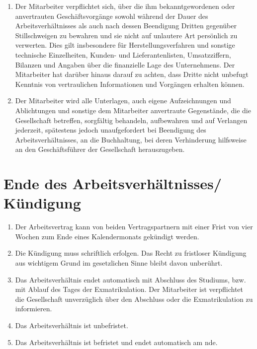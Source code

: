 \documentclass[twoside,a4paper]{scrreprt}
\begin{document}
\centerline{ }
\begin{enumerate}[label=(\alph*)]
	\item Der Mitarbeiter verpflichtet sich, über die ihm bekanntgewordenen oder anvertrauten Geschäftsvorgänge sowohl während der Dauer des Arbeitsverhältnisses als auch nach dessen Beendigung Dritten gegenüber Stillschweigen zu bewahren und sie nicht auf unlautere Art persönlich zu verwerten. Dies gilt insbesondere für Herstellungsverfahren und sonstige technische Einzelheiten, Kunden- und Lieferantenlisten, Umsatzziffern, Bilanzen und Angaben über die finanzielle Lage des Unternehmens. Der Mitarbeiter hat darüber hinaus darauf zu achten, dass Dritte nicht unbefugt Kenntnis von vertraulichen Informationen und Vorgängen erhalten können.
	\item Der Mitarbeiter wird alle Unterlagen, auch eigene Aufzeichnungen und Ablichtungen und sonstige dem Mitarbeiter anvertraute Gegenstände, die die Gesellschaft betreffen, sorgfältig behandeln, aufbewahren und auf Verlangen jederzeit, spätestens jedoch unaufgefordert bei Beendigung des Arbeitsverhältnisses, an die Buchhaltung, bei deren Verhinderung hilfsweise an den Geschäftsführer der Gesellschaft herauszugeben.
\end{enumerate}

\section{Ende des Arbeitsverhältnisses/ Kündigung}

\centerline{ }
\begin{enumerate}[label=(\alph*)]
	\item Der Arbeitsvertrag kann von beiden Vertragspartnern mit einer Frist von vier Wochen zum Ende eines Kalendermonats gekündigt werden.
	\item Die Kündigung muss schriftlich erfolgen. Das Recht zu fristloser Kündigung aus wichtigem Grund im gesetzlichen Sinne bleibt davon unberührt.
	\ifdefined\istStudent
	    \item Das Arbeitsverhältnis endet automatisch mit Abschluss des Studiums, bzw. mit Ablauf des Tages der Exmatrikulation. Der Mitarbeiter ist verpflichtet die Gesellschaft unverzüglich über den Abschluss oder die Exmatrikulation zu informieren.
	\fi
	\ifdefined\istUnbefristet
	    \item Das Arbeitsverhältnis ist unbefristet.
	\else
	    \item Das Arbeitsverhältnis ist befristet und endet automatisch am nde.
	\fi
\end{enumerate}
\end{document}
